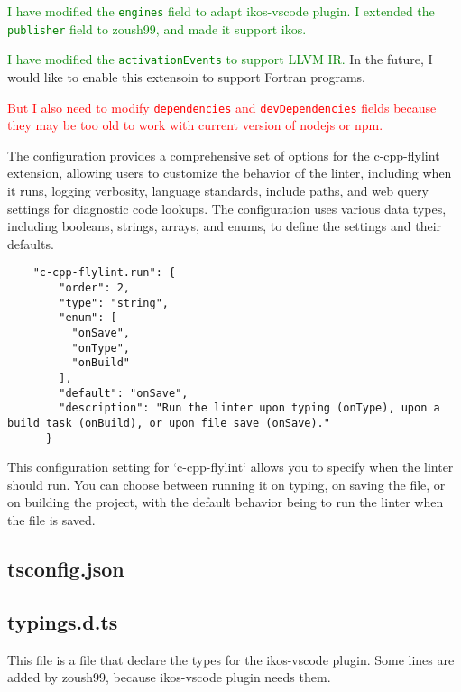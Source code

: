 \documentclass[12pt]{article}
\begin{document}
\textcolor{green}{I have modified the \texttt{engines} field to adapt ikos-vscode plugin. I extended the \texttt{publisher} field to zoush99, and made it support ikos.}

\textcolor{green}{I have modified the \texttt{activationEvents} to support LLVM IR.} In the future, I would like to enable this extensoin to support Fortran programs.

\textcolor{red}{But I also need to modify \texttt{dependencies} and \texttt{devDependencies} fields because they may be too old to work with current version of nodejs or npm.}

The configuration provides a comprehensive set of options for the c-cpp-flylint extension, allowing users to customize the behavior of the linter, including when it runs, logging verbosity, language standards, include paths, and web query settings for diagnostic code lookups. The configuration uses various data types, including booleans, strings, arrays, and enums, to define the settings and their defaults.

\begin{lstlisting}
    "c-cpp-flylint.run": {
        "order": 2,
        "type": "string",
        "enum": [
          "onSave",
          "onType",
          "onBuild"
        ],
        "default": "onSave",
        "description": "Run the linter upon typing (onType), upon a build task (onBuild), or upon file save (onSave)."
      }
\end{lstlisting}

This configuration setting for `c-cpp-flylint` allows you to specify when the linter should run. You can choose between running it on typing, on saving the file, or on building the project, with the default behavior being to run the linter when the file is saved.





\subsection{tsconfig.json}

\subsection{typings.d.ts}
This file is a file that declare the types for the ikos-vscode plugin. Some lines are added by zoush99, because ikos-vscode plugin needs them.
\end{document}

